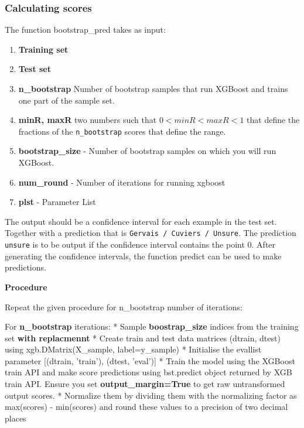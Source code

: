 \documentclass[11pt]{article}
\providecommand{\tightlist}{%
      \setlength{\itemsep}{0pt}\setlength{\parskip}{0pt}}
\begin{document}
    \subsubsection{Calculating scores}\label{calculating-scores}

    The function bootstrap\_pred takes as input:

\begin{enumerate}
\def\labelenumi{\arabic{enumi}.}
\tightlist
\item
  \textbf{Training set}
\item
  \textbf{Test set}
\item
  \textbf{n\_bootstrap} Number of bootstrap samples that run XGBoost and
  trains one part of the sample set.
\item
  \textbf{minR, maxR} two numbers such that \(0 < minR < maxR < 1\) that
  define the fractions of the \texttt{n\_bootstrap} scores that define
  the range.
\item
  \textbf{bootstrap\_size} - Number of bootstrap samples on which you
  will run XGBoost.
\item
  \textbf{num\_round} - Number of iterations for running xgboost
\item
  \textbf{plst} - Parameter List
\end{enumerate}

The output should be a confidence interval for each example in the test
set. Together with a prediction that is
\texttt{Gervais\ /\ Cuviers\ /\ Unsure}. The prediction \texttt{unsure}
is to be output if the confidence interval contains the point 0. After
generating the confidence intervals, the function predict can be used to
make predictions.

    \textbf{Procedure}

Repeat the given procedure for n\_bootstrap number of iterations:

For \textbf{n\_bootstrap} iterations: * Sample \textbf{boostrap\_size}
indices from the training set \textbf{with replacmennt} * Create train
and test data matrices (dtrain, dtest) using xgb.DMatrix(X\_sample,
label=y\_sample) * Initialise the evallist parameter {[}(dtrain,
'train'), (dtest, 'eval'){]} * Train the model using the XGBoost train
API and make score predictions using bst.predict object returned by XGB
train API. Ensure you set \textbf{output\_margin=True} to get raw
untransformed output scores. * Normalize them by dividing them with the
normalizing factor as max(scores) - min(scores) and round these values
to a precision of two decimal places
\end{document}
